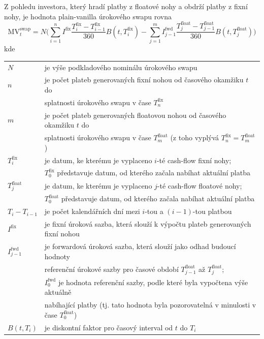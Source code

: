 \documentclass[a4paper]{book}
\begin{document}
Z pohledu investora, který hradí platby z floatové nohy a obdrží platby z fixní nohy, je hodnota plain-vanilla úrokového swapu rovna
\begin{equation}
\mathrm{MV}_t^{\mathrm{swap}} = N \Bigg( \sum_{i=1}^n I^{\mathrm{fix}} \frac{T_i^{\mathrm{fix}}-T_{i-1}^{\mathrm{fix}}}{360}B(t,T_i^{\mathrm{fix}}) - \sum_{j=1}^m I_{j-1}^{\mathrm{fwd}} \frac{T_j^{\mathrm{float}}-T_{j-1}^{\mathrm{float}}}{360}B(t,T_j^{\mathrm{float}}) \Bigg)
\end{equation}
kde
\begin{center}
\begin{tabular}{l l}
$N$ & je výše podkladového nominálu úrokového swapu\\
$n$ & je počet plateb generovaných fixní nohou od časového okamžiku $t$ do\\
    & splatnosti úrokového swapu v čase $T_n^{\mathrm{fix}}$\\
$m$ & je počet plateb generovaných floatovou nohou od časového okamžiku $t$ do\\
    & splatnosti úrokového swapu v čase $T_m^{\mathrm{float}}$ (z toho vyplývá $T_n^{\mathrm{fix}} = T_m^{\mathrm{float}}$)\\
$T_i^{\mathrm{fix}}$ & je datum, ke kterému je vyplaceno $i$-té cash-flow fixní nohy;\\
                     & $T_0^{\mathrm{fix}}$ představuje datum, od kterého začala nabíhat aktuální platba\\
$T_j^{\mathrm{float}}$ & je datum, ke kterému je vyplaceno $j$-té cash-flow floatové nohy;\\
                       & $T_0^{\mathrm{float}}$ představuje datum, od kterého začala nabíhat aktuální platba\\
$T_{i} - T_{i-1}$ & je počet kalendářních dní mezi $i$-tou a $(i-1)$-tou platbou\\      
$I^{\mathrm{fix}}$ & je fixní úroková sazba, která slouží k výpočtu plateb generovaných fixní nohou\\
$I_{j-1}^{\mathrm{fwd}}$ & je forwardová úroková sazba, která slouží jako odhad budoucí hodnoty\\
                         & referenční úrokové sazby pro časové období $T_{j-1}^{\mathrm{float}}$ až $T_j^{\mathrm{float}}$;\\
                         & $I_0^{\mathrm{fwd}}$ je hodnota referenční sazby, podle které byla vypočtena výše aktuálně\\
                         & nabíhající platby (tj. tato hodnota byla pozorovatelná v minulosti v čase $T_0^{\mathrm{float}}$)\\
$B(t,T_i)$      & je diskontní faktor pro časový interval od $t$ do $T_i$\\
\end{tabular}
\end{center}
\end{document}
